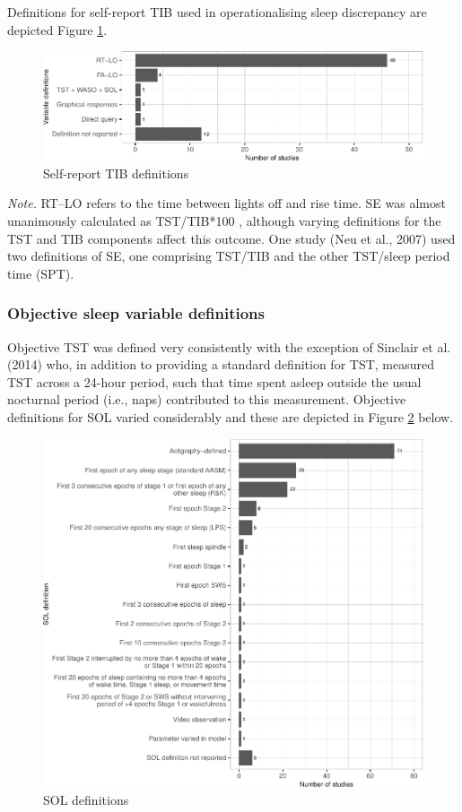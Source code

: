\documentclass[
]{article}
\begin{document}
Definitions for self-report TIB used in operationalising sleep discrepancy are depicted Figure \ref{fig:tibdef}.

\begin{figure}
\centering
\includegraphics{review_markdown_files/figure-latex/tibdef-1.pdf}
\caption{\label{fig:tibdef}Self-report TIB definitions}
\end{figure}

\emph{Note.} RT--LO refers to the time between lights off and rise time. SE was almost unanimously calculated as TST/TIB*100 , although varying definitions for the TST and TIB components affect this outcome. One study (Neu et al., 2007) used two definitions of SE, one comprising TST/TIB and the other TST/sleep period time (SPT).

\subsubsection{Objective sleep variable definitions}\label{objective-sleep-variable-definitions}

Objective TST was defined very consistently with the exception of Sinclair et al. (2014) who, in addition to providing a standard definition for TST, measured TST across a 24-hour period, such that time spent asleep outside the usual nocturnal period (i.e., naps) contributed to this measurement. Objective definitions for SOL varied considerably and these are depicted in Figure \ref{fig:SOL} below.\\

\begin{figure}
\centering
\includegraphics{review_markdown_files/figure-latex/SOL-1.pdf}
\caption{\label{fig:SOL}SOL definitions}
\end{figure}
\end{document}

